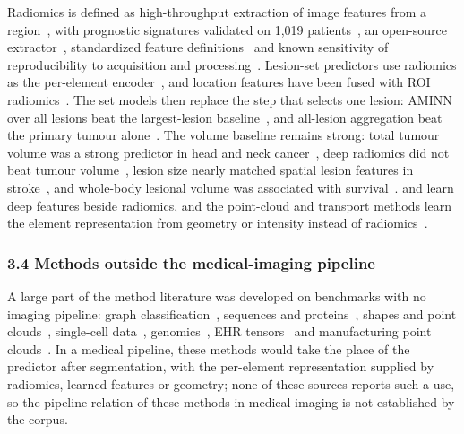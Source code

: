 \documentclass[journal,onecolumn]{IEEEtran}
\begin{document}
Radiomics is defined as high-throughput extraction of image features from a region~\cite{Lambin2012Radiomics,Gillies2016Radiomics}, with prognostic signatures validated on 1,019 patients~\cite{Aerts2014Decoding}, an open-source extractor~\cite{vanGriethuysen2017Computational}, standardized feature definitions~\cite{Zwanenburg2020Image} and known sensitivity of reproducibility to acquisition and processing~\cite{Traverso2018Repeatability}. Lesion-set predictors use radiomics as the per-element encoder~\cite{Chen2021AMINN,Chen2022LungMIL,Alberb2026Automated,Karimzadeh2026Revisiting,Diao2024Multi,Xu2024Hybrid,Wilk2025Towards,Geady2025Radiomic,Sabouri2025Enhancing}, and location features have been fused with ROI radiomics~\cite{Liu2023Coordinatized}. The set models then replace the step that selects one lesion: AMINN over all lesions beat the largest-lesion baseline~\cite{Chen2021AMINN}, and all-lesion aggregation beat the primary tumour alone~\cite{Wilk2025Towards}. The volume baseline remains strong: total tumour volume was a strong predictor in head and neck cancer~\cite{Geady2025Radiomic}, deep radiomics did not beat tumour volume~\cite{Janse2026Deep}, lesion size nearly matched spatial lesion features in stroke~\cite{Sperber2023Stroke}, and whole-body lesional volume was associated with survival~\cite{Kendrick2022Fully}. \cite{Diao2024Multi} and \cite{Xu2024Hybrid} learn deep features beside radiomics, and the point-cloud and transport methods learn the element representation from geometry or intensity instead of radiomics~\cite{GutierrezBecker2018MSPNet,Chen2024TractGeoNet,Kundu2018Discovery,Gong2026Robust}.

\subsubsection{3.4 Methods outside the medical-imaging pipeline}

A large part of the method literature was developed on benchmarks with no imaging pipeline: graph classification~\cite{Vayer2019Structured,VincentCuaz2022Template,Kolouri2021Wasserstein,Togninalli2019Wasserstein,Wang2024Graph,Xu2023Representing}, sequences and proteins~\cite{Mialon2021Trainable}, shapes and point clouds~\cite{Beier2022Linear,Bai2025Linear,ShifatERabbi2025Linear,Mallery2025Synthesis}, single-cell data~\cite{Wang2025Linearized,vanDijk2024CytoSummaryNet}, genomics~\cite{Little2023Associating}, EHR tensors~\cite{Ren2023MULTIPAR,Konyar2025SemiSupervised,Patalano2026PAR2COX} and manufacturing point clouds~\cite{Yan2019Structured,Biehler2024ANTLER}. In a medical pipeline, these methods would take the place of the predictor after segmentation, with the per-element representation supplied by radiomics, learned features or geometry; none of these sources reports such a use, so the pipeline relation of these methods in medical imaging is not established by the corpus.
\end{document}
